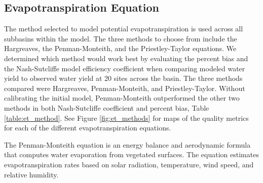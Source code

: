 
\subsection{Evapotranspiration Equation}\label{sec:et_methods}

The method selected to model potential evapotranspiration is used across all subbasins within the model.  The three methods to choose from include the Hargreaves, the Penman-Monteith, and the Priestley-Taylor equations.  We determined which method would work best by evaluating the percent bias and the Nash-Sutcliffe model efficiency coefficient  when comparing modeled water yield to observed water yield at 20 sites across the basin. The three methods compared were Hargreaves, Penman-Monteith, and Priestley-Taylor. Without calibrating the initial model, Penman-Monteith outperformed the other two methods in both Nash-Sutcliffe coefficient and percent bias, Table \ref{table:et_method}. See Figure \ref{fig:et_methods} for maps of the quality metrics for each of the different evapotranspiration equations.

The Penman-Monteith equation is an energy balance and aerodynamic formula that computes water evaporation from vegetated surfaces.  The equation estimates evapotranspiration rates based on solar radiation, temperature, wind speed, and relative humidity.
